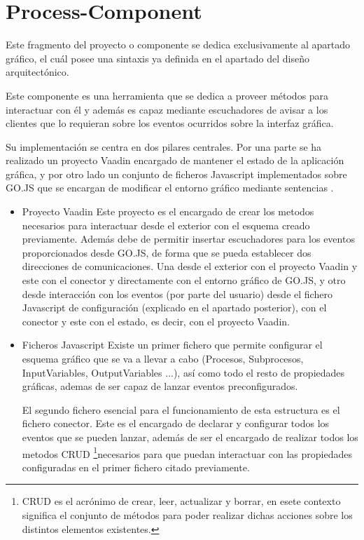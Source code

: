 \chapter{Process-Component}
	
	

Este fragmento del proyecto o componente se dedica exclusivamente al apartado gráfico, el cuál posee una sintaxis ya definida en el apartado del diseño arquitectónico.



Este componente es una herramienta que se dedica a proveer métodos para interactuar con él y además es capaz mediante escuchadores de avisar a los clientes que lo requieran sobre los eventos ocurridos sobre la interfaz gráfica.


Su implementación se centra en dos pilares centrales. Por una parte se ha realizado un proyecto Vaadin encargado de mantener el estado de la aplicación gráfica, y por otro lado un conjunto de ficheros Javascript implementados sobre GO.JS que se encargan de modificar el entorno gráfico mediante sentencias .
\begin{itemize}
	\item Proyecto Vaadin
	\subitem Este proyecto es el encargado de crear los metodos necesarios para interactuar desde el exterior con el esquema creado previamente. Además debe de permitir insertar escuchadores para los eventos proporcionados desde GO.JS, de forma que se pueda establecer dos direcciones de comunicaciones. Una desde el exterior con el proyecto Vaadin y este con el conector y directamente con el entorno gráfico de GO.JS, y otro desde interacción con los eventos (por parte del usuario) desde el fichero Javascript de configuración (explicado en el apartado posterior), con el conector y este con el estado, es decir, con el proyecto Vaadin.
	
	\item Ficheros Javascript
	\subitem Existe un primer fichero que permite configurar el esquema gráfico que se va a llevar a cabo (Procesos, Subprocesos, InputVariables, OutputVariables ...), así como todo el resto de propiedades gráficas, ademas de ser capaz de lanzar eventos preconfigurados.
	
	
	El segundo fichero esencial para el funcionamiento de esta estructura es el fichero conector. Este es el encargado de declarar y configurar todos los eventos que se pueden lanzar, además de ser el encargado de realizar todos los metodos CRUD \footnote{CRUD es el acrónimo de crear, leer, actualizar y borrar, en esete contexto significa el conjunto de métodos para poder realizar dichas acciones sobre los distintos elementos existentes.}necesarios para que puedan interactuar con las propiedades configuradas en el primer fichero citado previamente.
\end{itemize}

